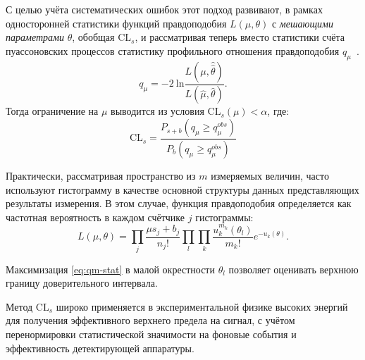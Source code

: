 С целью учёта систематических ошибок этот подход развивают,
в рамках односторонней статистики функций
правдоподобия $L(\mu, \theta)$ с \emph{мешающими параметрами} $\theta$,
обобщая $\text{CL}_s$, и рассматривая теперь вместо статистики счёта
пуассоновских процессов статистику
профильного отношения
правдоподобия $q_\mu$~\cite{bityukov-krasnikov, read-cls, cls-harel}.
\begin{equation}
    q_{\mu} = -2 ~\text{ln} \frac{L(\mu,\hat{\hat{\theta}})}{L(\hat{\mu}, \hat{\theta})}.
    \label{eq:qm-stat}
\end{equation}
Тогда ограничение на $\mu$ выводится из условия $\text{CL}_s (\mu) < \alpha$, где:
\begin{equation}
    \text{CL}_s = \frac{P_{s+b} (q_\mu \ge q^{obs}_{\mu})}{P_{b} (q_\mu \ge q^{obs}_{\mu})}
\end{equation}

Практически, рассматривая пространство из $m$ измеряемых величин,
часто используют гистограмму в качестве основной структуры данных
представляющих результаты измерения. В этом случае, функция
правдоподобия определяется как частотная вероятность в каждом
счётчике $j$ гистограммы:
\begin{equation}
    L(\mu,\theta) =\prod\limits_{j} \frac{\mu s_j + b_j}{n_j!}
        \prod\limits_{l} \prod\limits_{k} \frac{u_k^{m_k} (\theta_l)}{m_k!} e^{-u_k (\theta)}.
\end{equation}

Максимизация \eqref{eq:qm-stat} в малой окрестности $\theta_l$ позволяет
оценивать верхнюю границу доверительного интервала.

Метод $\text{CL}_s$ широко применяется в экспериментальной физике
высоких энергий для получения эффективного верхнего предела на сигнал,
с учётом перенормировки статистической значимости на фоновые события
и эффективность детектирующей аппаратуры.


